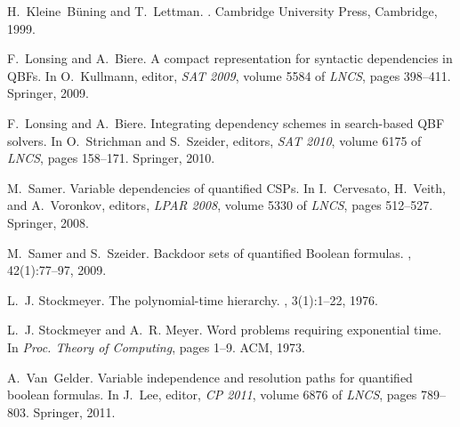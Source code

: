 \documentclass{llncs}
\begin{document}
\begin{thebibliography}{10}
H.~Kleine~B{\"u}ning and T.~Lettman.
.
\newblock Cambridge University Press, Cambridge, 1999.

F.~Lonsing and A.~Biere.
\newblock A compact representation for syntactic dependencies in {QBFs}.
\newblock In O.~Kullmann, editor, {\em SAT 2009}, volume 5584 of {\em LNCS}, pages
  398--411. Springer, 2009.

 F.~Lonsing and A.~Biere.  \newblock Integrating
  dependency schemes in search-based {QBF} solvers.  \newblock In O.~Strichman
  and S.~Szeider, editors, {\em SAT 2010}, volume 6175 of {\em LNCS}, pages
  158--171. Springer, 2010.

M.~Samer.
\newblock Variable dependencies of quantified {CSPs}.
\newblock In I.~Cervesato, H.~Veith, and A.~Voronkov, editors, {\em LPAR 2008},
  volume 5330 of {\em LNCS}, pages 512--527. Springer, 2008.

M.~Samer and S.~Szeider.
\newblock Backdoor sets of quantified {B}oolean formulas.
, 42(1):77--97, 2009.

L.~J. Stockmeyer.
\newblock The polynomial-time hierarchy.
, 3(1):1--22, 1976.

L.~J. Stockmeyer and A.~R. Meyer.
\newblock Word problems requiring exponential time.
\newblock In {\em Proc. Theory of Computing}, pages 1--9. ACM, 1973.

 A.~Van~Gelder.  \newblock Variable independence and
  resolution paths for quantified boolean formulas.  \newblock In J.~Lee,
  editor, {\em CP 2011}, volume 6876 of {\em LNCS}, pages 789--803. Springer,
  2011.

\end{thebibliography}
\end{document}
